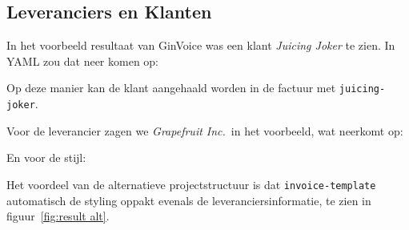 \subsection{Leveranciers en Klanten}\label{sec:supplier and client}
In het voorbeeld resultaat van GinVoice was een klant \textit{Juicing Joker} te zien.
In YAML zou dat neer komen op:


Op deze manier kan de klant aangehaald worden in de factuur met \texttt{juicing-joker}.

Voor de leverancier zagen we \textit{Grapefruit Inc.}\ in het voorbeeld, wat neerkomt op:


En voor de stijl:


Het voordeel van de alternatieve projectstructuur is dat \texttt{invoice-template} automatisch de styling oppakt evenals de leveranciersinformatie, te zien in figuur~\ref{fig:result alt}.

\onecolumn
